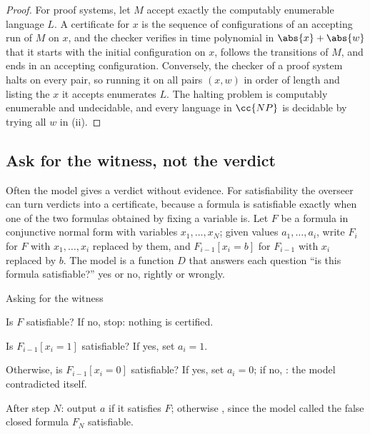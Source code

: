 \begin{refsection}
\begin{proof}
For proof systems, let $M$ accept exactly the computably enumerable language $L$. A certificate for $x$ is the sequence of configurations of an accepting run of $M$ on $x$, and the checker verifies in time polynomial in $\abs{x}+\abs{w}$ that it starts with the initial configuration on $x$, follows the transitions of $M$, and ends in an accepting configuration. Conversely, the checker of a proof system halts on every pair, so running it on all pairs $(x,w)$ in order of length and listing the $x$ it accepts enumerates $L$. The halting problem is computably enumerable and undecidable, and every language in $\cc{NP}$ is decidable by trying all $w$ in (ii).
\end{proof}

\subsection{Ask for the witness, not the verdict}

Often the model gives a verdict without evidence. For satisfiability the overseer can turn verdicts into a certificate, because a formula is satisfiable exactly when one of the two formulas obtained by fixing a variable is. Let $F$ be a formula in conjunctive normal form with variables $x_1,\dots,x_N$; given values $a_1,\dots,a_i$, write $F_i$ for $F$ with $x_1,\dots,x_i$ replaced by them, and $F_{i-1}[x_i{=}b]$ for $F_{i-1}$ with $x_i$ replaced by $b$. The model is a function $D$ that answers each question ``is this formula satisfiable?'' yes or no, rightly or wrongly.

\begin{protocol}{Asking for the witness}\label{prot:certificates:search}
\item[\msg{V}{P}] Is $F$ satisfiable? If no, stop: nothing is certified.
\item[\msg{V}{P}] Is $F_{i-1}[x_i{=}1]$ satisfiable? If yes, set $a_i=1$.
\item[\msg{V}{P}] Otherwise, is $F_{i-1}[x_i{=}0]$ satisfiable? If yes, set $a_i=0$; if no, \rej: the model contradicted itself.
\item[\act{V}] After step $N$: output $a$ if it satisfies $F$; otherwise \rej, since the model called the false closed formula $F_N$ satisfiable.
\end{protocol}


\end{refsection}
